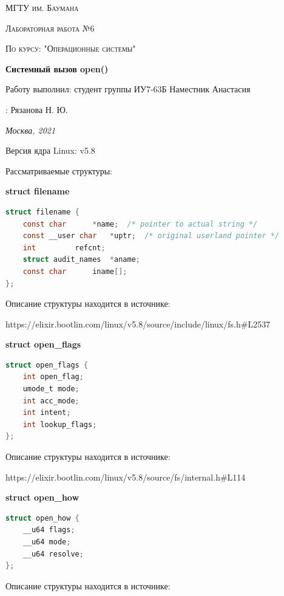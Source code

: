 \documentclass[12pt]{report}
\begin{document}
 
\begin{titlepage}
	\centering
	{\scshape\LARGE МГТУ им. Баумана \par}
	\vspace{3cm}
	{\scshape\Large Лабораторная работа №6\par}
	\vspace{0.5cm}	
	{\scshape\Large По курсу: "Операционные системы"\par}
	\vspace{1.5cm}
	{\huge\bfseries Системный вызов open()\par}
	\vspace{2cm}
	\Large Работу выполнил: студент группы ИУ7-63Б Наместник Анастасия\par
	\vspace{0.5cm}
	:  Рязанова Н. Ю.\par

	\vfill
	\large \textit {Москва, 2021} \par
\end{titlepage}


\newpage
	
Версия ядра Linux: v5.8		

Рассматриваемые структуры:


\textbf{struct filename}
\begin{lstlisting}[language=C]
struct filename {
	const char		*name;	/* pointer to actual string */
	const __user char	*uptr;	/* original userland pointer */
	int			refcnt;
	struct audit_names	*aname;
	const char		iname[];
};
\end{lstlisting}
Описание структуры находится в источнике: 

https://elixir.bootlin.com/linux/v5.8/source/include/linux/fs.h\#L2537


\textbf{struct open\_flags}
\begin{lstlisting}[language=C]
struct open_flags {
	int open_flag;
	umode_t mode;
	int acc_mode;
	int intent;
	int lookup_flags;
};
\end{lstlisting}
Описание структуры находится в источнике: 

https://elixir.bootlin.com/linux/v5.8/source/fs/internal.h\#L114


\textbf{struct open\_how}
\begin{lstlisting}[language=C]
struct open_how {
	__u64 flags;
	__u64 mode;
	__u64 resolve;
};
\end{lstlisting}
Описание структуры находится в источнике:
\end{document}

